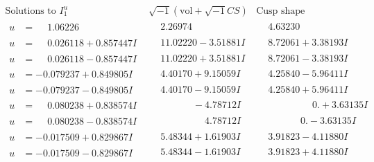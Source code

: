 \documentclass[1p]{elsarticle_modified}
\theoremstyle{definition}
\newcommand{\I}{\sqrt{-1}}
\begin{document}
$$\begin{array}{c|c|c}  
\text{Solutions to }I^u_{1}& \I (\text{vol} + \sqrt{-1}CS) & \text{Cusp shape}\\
 \hline 
\begin{aligned}
u &= \phantom{-}1.06226\phantom{ +0.000000I}\end{aligned}
 & \phantom{-}2.26974\phantom{ +0.000000I} & \phantom{-}4.63230\phantom{ +0.000000I} \\ \hline\begin{aligned}
u &= \phantom{-}0.026118 + 0.857447 I\end{aligned}
 & \phantom{-}11.02220 - 3.51881 I & \phantom{-}8.72061 + 3.38193 I \\ \hline\begin{aligned}
u &= \phantom{-}0.026118 - 0.857447 I\end{aligned}
 & \phantom{-}11.02220 + 3.51881 I & \phantom{-}8.72061 - 3.38193 I \\ \hline\begin{aligned}
u &= -0.079237 + 0.849805 I\end{aligned}
 & \phantom{-}4.40170 + 9.15059 I & \phantom{-}4.25840 - 5.96411 I \\ \hline\begin{aligned}
u &= -0.079237 - 0.849805 I\end{aligned}
 & \phantom{-}4.40170 - 9.15059 I & \phantom{-}4.25840 + 5.96411 I \\ \hline\begin{aligned}
u &= \phantom{-}0.080238 + 0.838574 I\end{aligned}
 & \phantom{-0.000000 } -4.78712 I & \phantom{-0.000000 -}0. + 3.63135 I \\ \hline\begin{aligned}
u &= \phantom{-}0.080238 - 0.838574 I\end{aligned}
 & \phantom{-0.000000 -}4.78712 I & \phantom{-0.000000 } 0. - 3.63135 I \\ \hline\begin{aligned}
u &= -0.017509 + 0.829867 I\end{aligned}
 & \phantom{-}5.48344 + 1.61903 I & \phantom{-}3.91823 - 4.11880 I \\ \hline\begin{aligned}
u &= -0.017509 - 0.829867 I\end{aligned}
 & \phantom{-}5.48344 - 1.61903 I & \phantom{-}3.91823 + 4.11880 I \\ \hline\begin{aligned}

\end{aligned}
\end{array}$$
\end{document}

